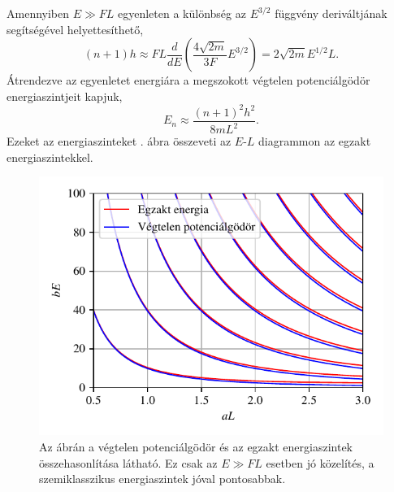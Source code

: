 Amennyiben $E \gg FL$  egyenleten a különbség az $E^{3/2}$ függvény deriváltjának segítségével helyettesíthető,
\begin{equation}
	(n+1)h \approx FL\frac{d}{dE}\left(\frac{4\sqrt{2m}}{3F}E^{3/2}\right)=2\sqrt{2m}E^{1/2}L.
\end{equation}
Átrendezve az egyenletet energiára a megszokott végtelen potenciálgödör energiaszintjeit kapjuk,
\begin{equation}
	E_n \approx \frac{(n+1)^2h^2}{8mL^2}.
	\label{semiclassicallevels:squarewell}
\end{equation}
Ezeket az energiaszinteket . ábra összeveti az $E$-$L$ diagrammon az egzakt energiaszintekkel.
\begin{figure}[H]
	\centering
	\includegraphics[scale=1]{./figs/infsquareenergia.pdf}
	\caption[Végtelen potenciálgödör energiaszintjei]{Az ábrán a végtelen potenciálgödör és az egzakt energiaszintek összehasonlítása látható. Ez csak az $E \gg FL$ esetben jó közelítés, a szemiklasszikus energiaszintek jóval pontosabbak.}
	\label{semiclassicallevels:squarewell}
\end{figure}
